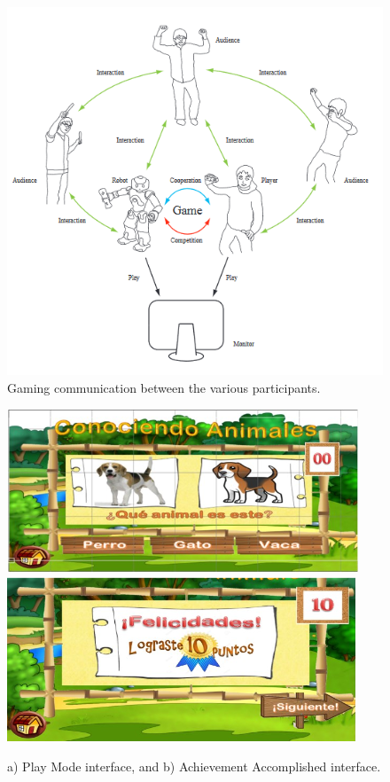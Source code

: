 \documentclass[runningheads]{llncs}
\begin{document}
\begin{figure}
    \centering
    \includegraphics[scale = 0.63]{Robot.png}
    \caption{Gaming communication between the various participants. \cite{ref_article12}}
    \label{fig:robot}
\end{figure}

\begin{figure}
    \centering
    \includegraphics[scale = 0.57]{AnimalArticle1.png}
    \includegraphics[scale = 0.57]{AnimalArticle2.png}
    \caption{a) Play Mode interface, and b) Achievement Accomplished interface. \cite{ref_article13}}
    \label{fig:seriousgame}
\end{figure}
\end{document}
